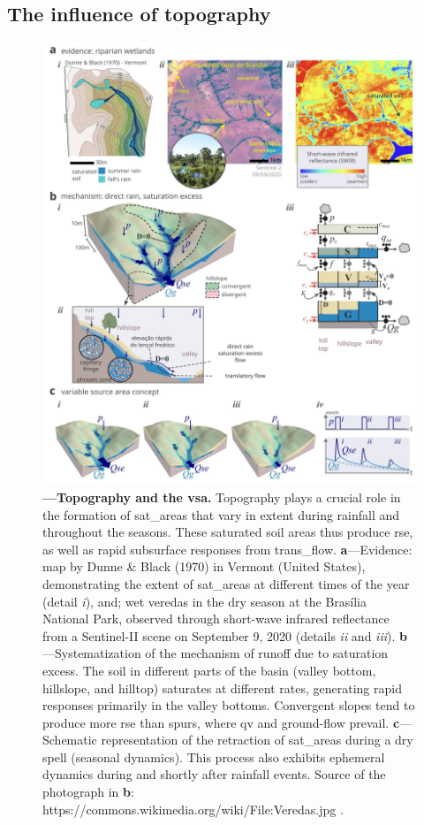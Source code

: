 \documentclass[./main_en.tex]{subfiles}
\begin{document}
\subsection{The influence of topography}

\begin{figure}[t!] 
\centering				
\includegraphics[width=0.98\linewidth]{figs/fig_topo_en.jpg}		
\caption[Topography and variable contributing area]
{\textbf{---\;Topography and the \gls{vsa}.}
    Topography plays a crucial role in the formation of \gls{sat_areas} that vary in extent during rainfall and throughout the seasons. These saturated soil areas thus produce \gls{rse}, as well as rapid subsurface responses from \gls{trans_flow}.
    \;\textbf{a}\;---\;Evidence: map by Dunne \& Black (1970) in Vermont (United States), demonstrating the extent of \gls{sat_areas} at different times of the year (detail \textrm{\textit{i}}), and; wet veredas in the dry season at the Brasília National Park, observed through short-wave infrared reflectance from a Sentinel-II scene on September 9, 2020 (details \textrm{\textit{ii}} and \textrm{\textit{iii}}).
    \;\textbf{b}\;---\;Systematization of the mechanism of runoff due to saturation excess. The soil in different parts of the basin (valley bottom, hillslope, and hilltop) saturates at different rates, generating rapid responses primarily in the valley bottoms. Convergent slopes tend to produce more \gls{rse} than \gls{spurs}, where \gls{qv} and \gls{ground-flow} prevail.
    \;\textbf{c}\;---\;Schematic representation of the retraction of \gls{sat_areas} during a dry spell (seasonal dynamics). This process also exhibits ephemeral dynamics during and shortly after rainfall events. Source of the photograph in \textbf{b}: https://commons.wikimedia.org/wiki/File:Veredas.jpg .
}
\label{fig:hydro:topo} 		
\end{figure}
\end{document}
